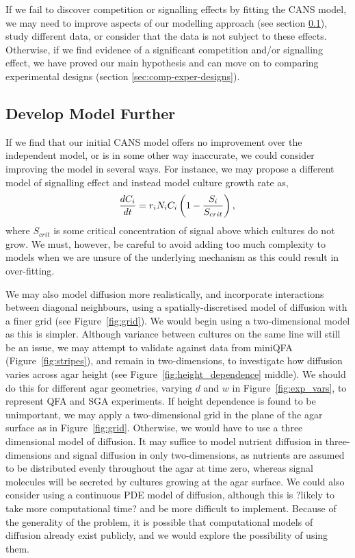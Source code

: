If we fail to discover competition or signalling effects by fitting
the CANS model, we may need to improve aspects of our modelling
approach (see section \ref{sec:dev-mod-further}), study different
data, or consider that the data is not subject to these
effects. Otherwise, if we find evidence of a significant competition
and/or signalling effect, we have proved our main hypothesis and can
move on to comparing experimental designs (section
\ref{sec:comp-exper-designs}).

\subsection{Develop Model Further}
\label{sec:dev-mod-further}
If we find that our initial CANS model offers no improvement over the
independent model, or is in some other way inaccurate, we could
consider improving the model in several ways. For instance, we may
propose a different model of signalling effect and instead model
culture growth rate as,
\begin{equation}
  \label{eq:7}
  \frac{dC_{i}}{dt} = r_{i}N_{i}C_{i}\left(1 - \frac{S_{i}}{S_{crit}}\right),\\
\end{equation}
where \(S_{crit}\) is some critical concentration of signal above
which cultures do not grow. We must, however, be careful to avoid
adding too much complexity to models when we are unsure of the
underlying mechanism as this could result in over-fitting.

We may also model diffusion more realistically, and incorporate
interactions between diagonal neighbours, using a
spatially-discretised model of diffusion with a finer grid (see
Figure~\ref{fig:grid}). We would begin using a two-dimensional model
as this is simpler. Although variance between cultures on the same
line will still be an issue, we may attempt to validate against data
from miniQFA (Figure~\ref{fig:stripes}), and remain in two-dimensions,
to investigate how diffusion varies across agar height (see
Figure~\ref{fig:height_dependence} middle). We should do this for
different agar geometries, varying \(d\) and \(w\) in
Figure~\ref{fig:exp_vars}, to represent QFA and SGA experiments. If
height dependence is found to be unimportant, we may apply a
two-dimensional grid in the plane of the agar surface as in
Figure~\ref{fig:grid}. Otherwise, we would have to use a three
dimensional model of diffusion. It may suffice to model nutrient
diffusion in three-dimensions and signal diffusion in only
two-dimensions, as nutrients are assumed to be distributed evenly
throughout the agar at time zero, whereas signal molecules will be
secreted by cultures growing at the agar surface. We could also
consider using a continuous PDE model of diffusion, although this is
?likely to take more computational time? and be more difficult to
implement. Because of the generality of the problem, it is possible
that computational models of diffusion already exist publicly, and we
would explore the possibility of using them.


